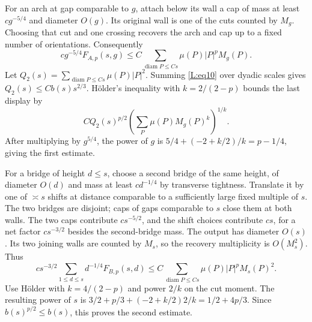 \documentclass[11pt]{article}
\numberwithin{equation}{section}
\theoremstyle{definition}\newtheorem{definition}[theorem]{Definition}
\theoremstyle{remark}\newtheorem{remark}[theorem]{Remark}
\begin{document}
For an arch at gap comparable to $g$, attach below its wall a cap of
mass at least $cg^{-5/4}$ and diameter $O(g)$.  Its original wall is
one of the cuts counted by $M_g$.  Choosing that cut and one crossing
recovers the arch and cap up to a fixed number of orientations.
Consequently
\[
 c g^{-5/4}F_{A,p}(s,g)
 \le C\sum_{\operatorname{diam}P\le Cs}\mu(P)|P|^p M_g(P).
\]
Let $Q_2(s)=\sum_{\operatorname{diam}P\le Cs}\mu(P)|P|^2$.
Summing \eqref{L:eq10} over dyadic scales gives
$Q_2(s)\le Cb(s)s^{2/3}$.  H\"older's inequality with
$k=2/(2-p)$ bounds the last display by
\[
 C Q_2(s)^{p/2}
 \left(\sum_P\mu(P)M_g(P)^k\right)^{1/k}.
\]
After multiplying by $g^{5/4}$, the power of $g$ is
$5/4+(-2+k/2)/k=p-1/4$, giving the first estimate.

For a bridge of height $d\le s$, choose a second bridge of the same
height, of diameter $O(d)$ and mass at least $cd^{-1/4}$ by transverse
tightness.  Translate it by one of $\asymp s$ shifts at distance
comparable to a sufficiently large fixed multiple of $s$.  The two
bridges are disjoint; caps of gaps comparable to $s$ close them at
both walls.  The two caps contribute $cs^{-5/2}$, and the shift
choices contribute $cs$, for a net factor $cs^{-3/2}$ besides the
second-bridge mass.  The output has diameter $O(s)$.  Its two joining
walls are counted by $M_s$, so the recovery multiplicity is
$O(M_s^2)$.  Thus
\[
 c s^{-3/2}\sum_{1\le d\le s}d^{-1/4}F_{B,p}(s,d)
 \le C\sum_{\operatorname{diam}P\le Cs}\mu(P)|P|^pM_s(P)^2.
\]
Use H\"older with $k=4/(2-p)$ and power $2/k$ on the cut moment.
The resulting power of $s$ is
$3/2+p/3+(-2+k/2)2/k=1/2+4p/3$.
Since $b(s)^{p/2}\le b(s)$, this proves the second estimate.
\end{document}
